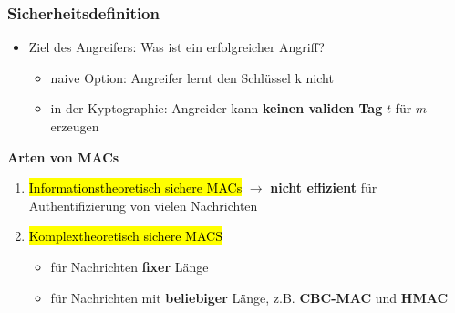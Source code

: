 \documentclass[a4paper, 10pt]{article}
\begin{document}
\subsubsection{Sicherheitsdefinition}
\begin{itemize}
    \item Ziel des Angreifers: Was ist ein erfolgreicher Angriff?
    \begin{itemize}
        \item naive Option: Angreifer lernt den Schlüssel k nicht
        \item in der Kyptographie: Angreider kann \textbf{keinen validen Tag} $t$ für $m$ erzeugen
    \end{itemize}
\end{itemize}
\textbf{Arten von MACs}
\begin{enumerate}
    \item \hl{Informationstheoretisch sichere MACs} $\longrightarrow$ \textbf{nicht effizient} für Authentifizierung von vielen Nachrichten
    \item \hl{Komplextheoretisch sichere MACS}
    \begin{itemize}
        \item für Nachrichten \textbf{fixer} Länge
        \item für Nachrichten mit \textbf{beliebiger} Länge, z.B. \textbf{CBC-MAC} und \textbf{HMAC}
    \end{itemize}
\end{enumerate}
\end{document}
